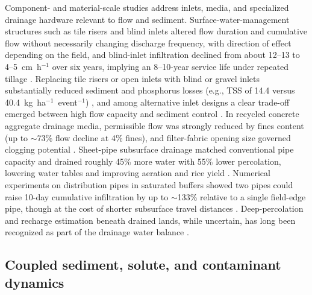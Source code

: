 \documentclass[11pt]{article}
\begin{document}
Component- and material-scale studies address inlets, media, and specialized drainage hardware relevant to flow and sediment. Surface-water-management structures such as tile risers and blind inlets altered flow duration and cumulative flow without necessarily changing discharge frequency, with direction of effect depending on the field, and blind-inlet infiltration declined from about 12--13 to 4--5~cm~h$^{-1}$ over six years, implying an 8--10-year service life under repeated tillage \parencite{Williams2020,Williams2019}. Replacing tile risers or open inlets with blind or gravel inlets substantially reduced sediment and phosphorus losses (e.g., TSS of 14.4 versus 40.4~kg~ha$^{-1}$~event$^{-1}$) \parencite{Feyereisen2015b}, and among alternative inlet designs a clear trade-off emerged between high flow capacity and sediment control \parencite{Li2017b}. In recycled concrete aggregate drainage media, permissible flow was strongly reduced by fines content (up to $\sim$73\% flow decline at 4\% fines), and filter-fabric opening size governed clogging potential \parencite{McCulloch2017}. Sheet-pipe subsurface drainage matched conventional pipe capacity and drained roughly 45\% more water with 55\% lower percolation, lowering water tables and improving aeration and rice yield \parencite{Tamura2021,Arif2021}. Numerical experiments on distribution pipes in saturated buffers showed two pipes could raise 10-day cumulative infiltration by up to $\sim$133\% relative to a single field-edge pipe, though at the cost of shorter subsurface travel distances \parencite{Jaynes2019b}. Deep-percolation and recharge estimation beneath drained lands, while uncertain, has long been recognized as part of the drainage water balance \parencite{BOOKMAN1959}.

\subsection{Coupled sediment, solute, and contaminant dynamics}
\end{document}
